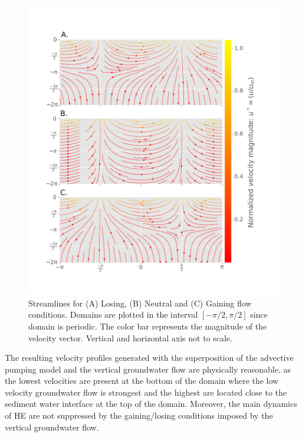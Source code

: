 \documentclass[draft,linenumbers]{agujournal2018}
\begin{document}
\begin{figure}[ht]
\centering
\includegraphics[width=35pc]
{190131_Streamlines.pdf}
\caption{Streamlines for (A) Losing, (B) Neutral and (C) Gaining flow conditions. Domains are plotted in the interval $[-\pi /2, \pi/2]$ since domain is periodic. The color bar represents the magnitude of the velocity vector. Vertical and horizontal axis not to scale.}
\label{Velocities}
\end{figure}

The resulting velocity profiles generated with the superposition of the advective pumping model and the vertical groundwater flow are physically reasonable, as the lowest velocities are present at the bottom of the domain where the low velocity groundwater flow is strongest and the highest are located close to the sediment water interface at the top of the domain. Moreover, the main dynamics of HE are not suppressed by the gaining/losing conditions imposed by the vertical groundwater flow.
\end{document}
